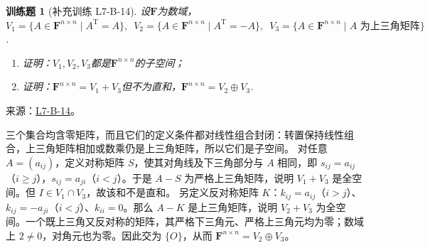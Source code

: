 \documentclass[UTF8,12pt,a4paper,fontset=fandol]{ctexart}
\newtheorem{exercise}{训练题}[section]
\begin{document}
\begin{exercise}[补充训练 L7-B-14]\label{prob:L7-B-14}
设$\mathbf{F}$为数域，$V_1=\{A\in\mathbf{F}^{n\times n} \mid A^\mathrm{T}=A\},\enspace
            V_2=\{A\in\mathbf{F}^{n\times n} \mid A^\mathrm{T}=-A\},\enspace V_3=\{A\in\mathbf{F}^{n\times n} \mid A\text{~为上三角矩阵}\}$.
        \begin{enumerate}
            \item 证明：$V_1,V_2,V_3$都是$\mathbf{F}^{n\times n}$的子空间；

            \item 证明：$\mathbf{F}^{n\times n}=V_1+V_3$但不为直和，$\mathbf{F}^{n\times n}=V_2\oplus V_3$.
        \end{enumerate}
\end{exercise}
\noindent 来源：\href{https://github.com/yhwu-is/Linear-Algebra-Left-Undone/blob/new/%E8%AE%B2%E4%B9%89/%E4%B8%93%E9%A2%98/7%20%E7%BA%BF%E6%80%A7%E6%98%A0%E5%B0%84%E7%9F%A9%E9%98%B5%E8%A1%A8%E7%A4%BA%E4%B8%8E%E7%9F%A9%E9%98%B5%E8%BF%90%E7%AE%97%E5%9F%BA%E7%A1%80.tex}{L7-B-14}。
\begin{solve}
三个集合均含零矩阵，而且它们的定义条件都对线性组合封闭：转置保持线性组合，上三角矩阵相加或数乘仍是上三角矩阵，所以它们是子空间。
对任意 $A=(a_{ij})$，定义对称矩阵 $S$，使其对角线及下三角部分与 $A$ 相同，即 $s_{ij}=a_{ij}$（$i\ge j$），$s_{ij}=a_{ji}$（$i<j$）。于是 $A-S$ 为严格上三角矩阵，说明 $V_1+V_3$ 是全空间。但 $I\in V_1\cap V_3$，故该和不是直和。
另定义反对称矩阵 $K$：$k_{ij}=a_{ij}$（$i>j$）、$k_{ij}=-a_{ji}$（$i<j$）、$k_{ii}=0$。那么 $A-K$ 是上三角矩阵，说明 $V_2+V_3$ 为全空间。一个既上三角又反对称的矩阵，其严格下三角元、严格上三角元均为零；数域上 $2\ne0$，对角元也为零。因此交为 $\{O\}$，从而 $\mathbf F^{n\times n}=V_2\oplus V_3$。
\end{solve}
\end{document}
